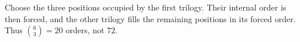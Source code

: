 Choose the three positions occupied by the first trilogy. Their internal order is then forced, and the other trilogy fills the remaining positions in its forced order. Thus $\boxed{\binom63=20}$ orders, not $72$.
